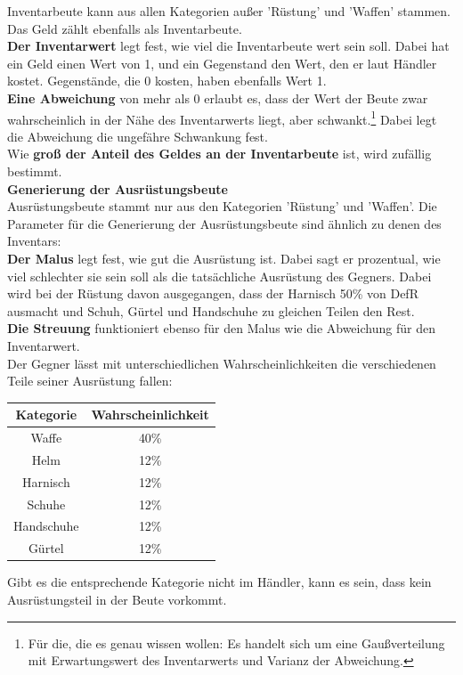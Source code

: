 \documentclass[11pt, a4paper, german]{article}
\begin{document}
Inventarbeute kann aus allen Kategorien außer 'Rüstung' und 'Waffen' stammen. Das Geld zählt ebenfalls als Inventarbeute.\\

\textbf{Der Inventarwert} legt fest, wie viel die Inventarbeute wert sein soll. Dabei hat ein Geld einen Wert von 1, und ein Gegenstand den Wert, den er laut Händler kostet. Gegenstände, die 0 kosten, haben ebenfalls Wert 1.\\

\textbf{Eine Abweichung} von mehr als 0 erlaubt es, dass der Wert der Beute zwar wahrscheinlich in der Nähe des Inventarwerts liegt, aber schwankt.\footnote{Für die, die es genau wissen wollen: Es handelt sich um eine Gaußverteilung mit Erwartungswert des Inventarwerts und Varianz der Abweichung.} Dabei legt die Abweichung die ungefähre Schwankung fest.\\

Wie \textbf{groß der Anteil des Geldes an der Inventarbeute} ist, wird zufällig bestimmt.\\

\textbf{Generierung der Ausrüstungsbeute}\\

Ausrüstungsbeute stammt nur aus den Kategorien 'Rüstung' und 'Waffen'. 
Die Parameter für die Generierung der Ausrüstungsbeute sind ähnlich zu denen des Inventars:\\

\textbf{Der Malus} legt fest, wie gut die Ausrüstung ist. Dabei sagt er prozentual, wie viel schlechter sie sein soll als die tatsächliche Ausrüstung des Gegners. Dabei wird bei der Rüstung davon ausgegangen, dass der Harnisch 50\% von DefR ausmacht und Schuh, Gürtel und Handschuhe zu gleichen Teilen den Rest.\\

\textbf{Die Streuung} funktioniert ebenso für den Malus wie die Abweichung für den Inventarwert.\\

Der Gegner lässt mit unterschiedlichen Wahrscheinlichkeiten die verschiedenen Teile seiner Ausrüstung fallen:\\
\begin{center}
\begin{tabular}{c|c}
Kategorie & Wahrscheinlichkeit\\
\hline
Waffe & 40\% \\
Helm & 12\% \\
Harnisch & 12\% \\
Schuhe & 12\% \\
Handschuhe & 12\% \\
Gürtel & 12\% \\
\end{tabular}
\end{center}
Gibt es die entsprechende Kategorie nicht im Händler, kann es sein, dass kein Ausrüstungsteil in der Beute vorkommt.
\end{document}

